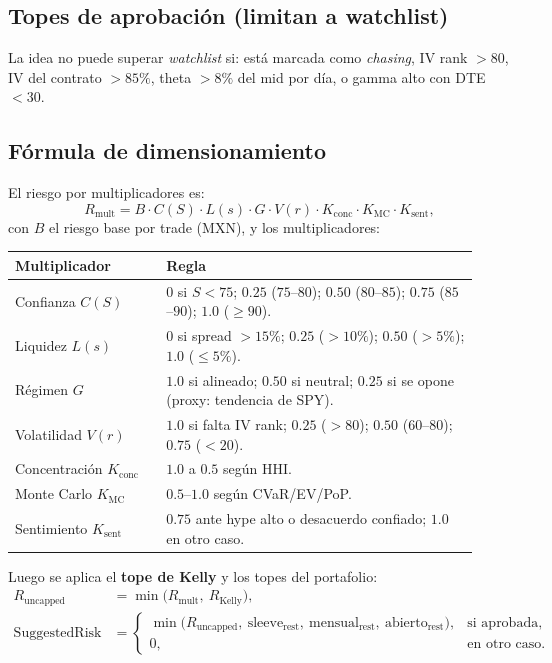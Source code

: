 \documentclass[11pt,letterpaper]{article}
\newcommand{\MXN}{\ensuremath{\mathrm{MXN}}}
\begin{document}
\subsection{Topes de aprobación (limitan a watchlist)}
La idea no puede superar \emph{watchlist} si: está marcada como \emph{chasing},
IV rank $>80$, IV del contrato $>85\%$, theta $>8\%$ del mid por día, o gamma alto
con DTE $<30$.

\subsection{Fórmula de dimensionamiento}

El riesgo por multiplicadores es:
\begin{equation}
R_{\text{mult}} = B \cdot C(S)\cdot L(s)\cdot G\cdot V(r)\cdot K_{\text{conc}}\cdot K_{\text{MC}}\cdot K_{\text{sent}},
\end{equation}
con $B$ el riesgo base por trade (\MXN), y los multiplicadores:

\begin{longtable}{p{0.30\linewidth} p{0.62\linewidth}}
\toprule
\textbf{Multiplicador} & \textbf{Regla} \\
\midrule
Confianza $C(S)$ & $0$ si $S<75$; $0.25$ ($75$--$80$); $0.50$ ($80$--$85$); $0.75$ ($85$--$90$); $1.0$ ($\ge 90$). \\
Liquidez $L(s)$ & $0$ si spread $>15\%$; $0.25$ ($>10\%$); $0.50$ ($>5\%$); $1.0$ ($\le 5\%$). \\
Régimen $G$ & $1.0$ si alineado; $0.50$ si neutral; $0.25$ si se opone (proxy: tendencia de SPY). \\
Volatilidad $V(r)$ & $1.0$ si falta IV rank; $0.25$ ($>80$); $0.50$ ($60$--$80$); $0.75$ ($<20$). \\
Concentración $K_{\text{conc}}$ & $1.0$ a $0.5$ según HHI. \\
Monte Carlo $K_{\text{MC}}$ & $0.5$--$1.0$ según CVaR/EV/PoP. \\
Sentimiento $K_{\text{sent}}$ & $0.75$ ante hype alto o desacuerdo confiado; $1.0$ en otro caso. \\
\bottomrule
\end{longtable}

Luego se aplica el \textbf{tope de Kelly} y los topes del portafolio:
\begin{align}
R_{\text{uncapped}} &= \min\big(R_{\text{mult}},\ R_{\text{Kelly}}\big), \\
\text{SuggestedRisk} &=
\begin{cases}
\min\!\big(R_{\text{uncapped}},\ \text{sleeve}_{\text{rest}},\ \text{mensual}_{\text{rest}},\ \text{abierto}_{\text{rest}}\big), & \text{si aprobada},\\
0, & \text{en otro caso}.
\end{cases}
\end{align}
\end{document}
